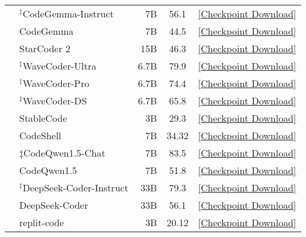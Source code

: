 \begin{table}[t!]
{{\begin{tabular}{clrcc}
         & $^\ddag$CodeGemma-Instruct \cite{codegemma_2024}  & 7B  & 56.1  & \href{https://huggingface.co/google/codegemma-7b-it}{[Checkpoint Download]}  \\
         & CodeGemma \cite{codegemma_2024}  & 7B  & 44.5  & \href{https://huggingface.co/google/codegemma-7b}{[Checkpoint Download]}  \\
         & StarCoder 2 \cite{lozhkov2024starcoder}  & 15B & 46.3 & \href{https://huggingface.co/bigcode/starcoder2-15b}{[Checkpoint Download]}\\
         & $^\ddag$WaveCoder-Ultra \cite{yu2023wavecoder} & 6.7B & 79.9  & \href{https://huggingface.co/microsoft/wavecoder-ultra-6.7b}{[Checkpoint Download]}  \\
         & $^\ddag$WaveCoder-Pro \cite{yu2023wavecoder} & 6.7B & 74.4  & \href{https://huggingface.co/microsoft/wavecoder-pro-6.7b}{[Checkpoint Download]}  \\
         & $^\ddag$WaveCoder-DS \cite{yu2023wavecoder} & 6.7B & 65.8  & \href{https://huggingface.co/microsoft/wavecoder-ds-6.7b}{[Checkpoint Download]}  \\
         & StableCode \cite{pinnaparaju2024stable} & 3B & 29.3  & \href{https://huggingface.co/stabilityai/stable-code-3b}{[Checkpoint Download]}  \\
         & CodeShell \cite{xie2024codeshell} & 7B & 34.32  & \href{https://huggingface.co/WisdomShell/CodeShell-7B}{[Checkpoint Download]}  \\
         & $\ddag$CodeQwen1.5-Chat \cite{codeqwen} & 7B & 83.5 & \href{https://huggingface.co/Qwen/CodeQwen1.5-7B-Chat}{[Checkpoint Download]}  \\
         & CodeQwen1.5 \cite{codeqwen} & 7B & 51.8 & \href{https://huggingface.co/Qwen/CodeQwen1.5-7B}{[Checkpoint Download]}  \\
         & $^\ddag$DeepSeek-Coder-Instruct \cite{guo2024deepseek} & 33B & 79.3  & \href{https://huggingface.co/deepseek-ai/deepseek-coder-33b-instruct}{[Checkpoint Download]}  \\
         & DeepSeek-Coder \cite{guo2024deepseek} & 33B & 56.1  & \href{https://huggingface.co/deepseek-ai/deepseek-coder-33b-base}{[Checkpoint Download]}  \\
         & replit-code \cite{replit-code} & 3B & 20.12  & \href{https://huggingface.co/replit/replit-code-v1-3b}{[Checkpoint Download]}  \\

\end{tabular}}}
\end{table}
